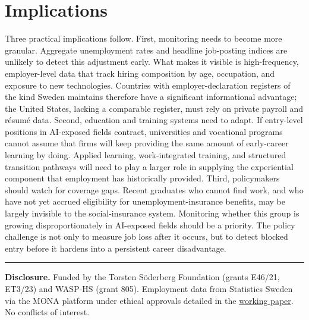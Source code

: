 \documentclass[12pt]{article}
\begin{document}
\section*{Implications}

Three practical implications follow. First, monitoring needs to become more granular. Aggregate
unemployment rates and headline job-posting indices are unlikely to detect this adjustment early. What
makes it visible is high-frequency, employer-level data that track hiring composition by age,
occupation, and exposure to new technologies. Countries with employer-declaration registers of the
kind Sweden maintains therefore have a significant informational advantage; the United States, lacking
a comparable register, must rely on private payroll and résumé data. Second, education and training
systems need to adapt. If entry-level positions in AI-exposed fields contract, universities and
vocational programs cannot assume that firms will keep providing the same amount of early-career
learning by doing. Applied learning, work-integrated training, and structured transition pathways will
need to play a larger role in supplying the experiential component that employment has historically
provided. Third, policymakers should watch for coverage gaps. Recent graduates who cannot find work,
and who have not yet accrued eligibility for unemployment-insurance benefits, may be largely invisible
to the social-insurance system. Monitoring whether this group is growing disproportionately in
AI-exposed fields should be a priority. The policy challenge is not only to measure job loss after it
occurs, but to detect blocked entry before it hardens into a persistent career disadvantage.

\bigskip
\noindent\rule{\textwidth}{0.4pt}

\noindent\textbf{Disclosure.} Funded by the Torsten S\"oderberg Foundation (grants E46/21, ET3/23)
and WASP-HS (grant 805). Employment data from Statistics Sweden via the MONA platform under ethical
approvals detailed in the
\href{https://github.com/Magnus-L/canaries-sweden/blob/main/paper/main.pdf}{working paper}. No
conflicts of interest.

%
%
\end{document}
